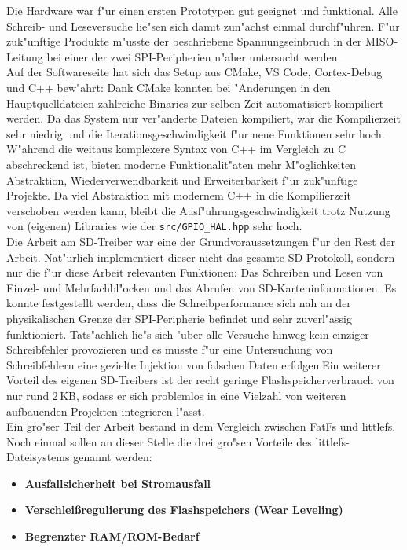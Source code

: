 \documentclass[11pt]{article}
\begin{document}
Die Hardware war f"ur einen ersten Prototypen gut geeignet und funktional. Alle Schreib-
und Leseversuche lie"sen sich damit zun"achst einmal durchf"uhren. F"ur zuk"unftige 
Produkte m"usste der beschriebene Spannungseinbruch in der MISO-Leitung bei einer der zwei SPI-Peripherien
n"aher untersucht werden. \\
Auf der Softwareseite hat sich das Setup aus CMake, VS Code, Cortex-Debug und C++ bew"ahrt:
Dank CMake konnten bei "Anderungen in den Hauptquelldateien zahlreiche Binaries zur selben
Zeit automatisiert kompiliert werden. Da das System nur ver"anderte Dateien kompiliert, war die 
Kompilierzeit sehr niedrig und die Iterationsgeschwindigkeit f"ur neue Funktionen sehr hoch.
W"ahrend die weitaus komplexere Syntax von C++ im Vergleich zu C abschreckend ist,
bieten moderne Funktionalit"aten mehr M"oglichkeiten Abstraktion, Wiederverwendbarkeit
und Erweiterbarkeit f"ur zuk"unftige Projekte. Da viel Abstraktion mit modernem C++ in
die Kompilierzeit verschoben werden kann, bleibt die Ausf"uhrungsgeschwindigkeit trotz
Nutzung von (eigenen) Libraries wie der \texttt{src/GPIO\_HAL.hpp} sehr hoch.\\
Die Arbeit am SD-Treiber war eine
der Grundvoraussetzungen f"ur den Rest der Arbeit. Nat"urlich implementiert dieser nicht 
das gesamte SD-Protokoll, sondern nur die f"ur diese Arbeit relevanten Funktionen:
Das Schreiben und Lesen von Einzel- und Mehrfachbl"ocken und das Abrufen von SD-Karteninformationen.
Es konnte festgestellt werden, dass die Schreibperformance sich nah an der physikalischen Grenze 
der SPI-Peripherie befindet und sehr zuverl"assig funktioniert. Tats"achlich lie"s sich "uber 
alle Versuche hinweg kein einziger Schreibfehler provozieren und es musste f"ur eine Untersuchung
von Schreibfehlern eine gezielte Injektion von falschen Daten erfolgen.Ein weiterer Vorteil des eigenen SD-Treibers 
ist der recht geringe Flashspeicherverbrauch von nur rund 2\,KB,
sodass er sich problemlos in eine Vielzahl von weiteren aufbauenden Projekten integrieren l"asst. \\
Ein gro"ser Teil der Arbeit bestand in dem Vergleich zwischen FatFs und littlefs.
Noch einmal sollen an dieser Stelle die drei gro"sen Vorteile des littlefs-Dateisystems genannt werden:
\begin{itemize}
    \item \textbf{Ausfallsicherheit bei Stromausfall} 
    \item \textbf{Verschleißregulierung des Flashspeichers (Wear Leveling)} 
    \item \textbf{Begrenzter RAM/ROM-Bedarf}
\end{itemize}
\end{document}
